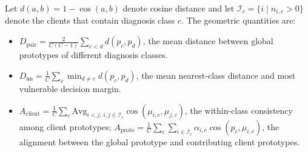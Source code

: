 \documentclass[letterpaper]{article} %
\begin{document}
Let \(d(a,b)=1-\cos(a,b)\) denote cosine distance and let \(\mathcal{I}_c=\{i\mid n_{i,c}>0\}\) denote the clients that contain diagnosis class \(c\). The geometric quantities are:
\begin{itemize}
\setlength{\itemsep}{0pt}
\item \(D_{\mathrm{pair}}=\frac{2}{C(C-1)}\sum_{c<d}d(p_c,p_d)\), the mean distance between global prototypes of different diagnosis classes.
\item \(D_{\mathrm{nn}}=\frac{1}{C}\sum_c \min_{d\ne c} d(p_c,p_d)\), the mean nearest-class distance and most vulnerable decision margin.
\item \(A_{\mathrm{client}}=\frac{1}{C}\sum_c \mathrm{Avg}_{i<j,\,i,j\in\mathcal{I}_c}\cos(\mu_{i,c},\mu_{j,c})\), the within-class consistency among client prototypes; \(A_{\mathrm{proto}}=\frac{1}{C}\sum_c\sum_{i\in\mathcal{I}_c}\alpha_{i,c}\cos(p_c,\mu_{i,c})\), the alignment between the global prototype and contributing client prototypes.
\end{itemize}
\end{document}

